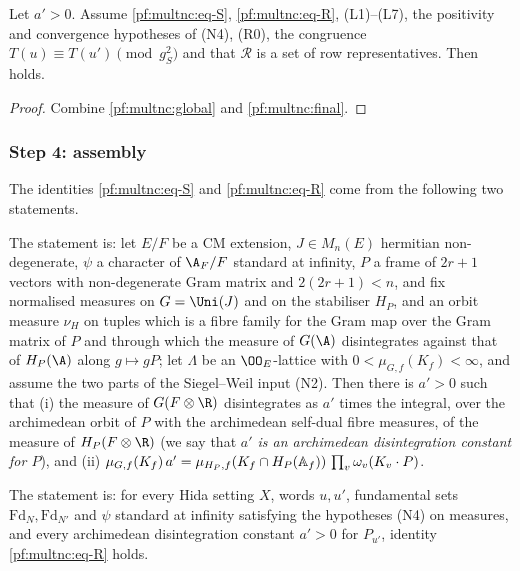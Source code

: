 \begin{corollary}\label{pf:multnc:arith}
Let $a'>0$. Assume \eqref{pf:multnc:eq-S}, \eqref{pf:multnc:eq-R}, (L1)--(L7), the positivity and convergence hypotheses of
(N4), (R0), the congruence $T(u)\equiv T(u')\pmod{g_S^2}$ and that $\mathcal R$ is a set of row representatives. Then
 holds.
\end{corollary}

\begin{proof}
Combine \cref{pf:multnc:global} and \cref{pf:multnc:final}.
\end{proof}

\subsubsection*{Step 4: assembly}

The identities \eqref{pf:multnc:eq-S} and \eqref{pf:multnc:eq-R} come from the following two statements.

\begin{definition}\label{pf:multnc:def-splitom}
The statement  is: let $E/F$ be a CM extension, $J\in M_n(E)$ hermitian non-degenerate, $\psi$ a character of
$\A_F/F$ standard at infinity, $P$ a frame of $2r+1$ vectors with non-degenerate Gram matrix and $2(2r+1)<n$, and fix
normalised measures on $G=\Uni(J)$ and on the stabiliser $H_P$, and an orbit measure $\nu_H$ on tuples which is a fibre
family for the Gram map over the Gram matrix of $P$ and through which the measure of $G(\A)$ disintegrates against that of
$H_P(\A)$ along $g\mapsto gP$; let $\Lambda$ be an $\OO_E$-lattice with $0<\mu_{G,f}(K_f)<\infty$, and assume the two parts
of the Siegel--Weil input (N2). Then there is $a'>0$ such that (i) the measure of $G(F\otimes\R)$ disintegrates as $a'$
times the integral, over the archimedean orbit of $P$ with the archimedean self-dual fibre measures, of the measure of
$H_P(F\otimes\R)$ (we say that \emph{$a'$ is an archimedean disintegration constant for $P$}), and (ii)
$\mu_{G,f}(K_f)\,a'=\mu_{H_P,f}(K_f\cap H_P(\mathbb{A}_{f}))\,\prod_v\omega_v(K_v\cdot P)$.
\end{definition}

\begin{definition}\label{pf:multnc:def-realbracket}
The statement  is: for every Hida setting $X$, words $u,u'$, fundamental sets $\mathrm{Fd}_N,\mathrm{Fd}_{N'}$
and $\psi$ standard at infinity satisfying the hypotheses (N4) on measures, and every archimedean disintegration constant
$a'>0$ for $P_{u'}$, identity \eqref{pf:multnc:eq-R} holds.
\end{definition}

